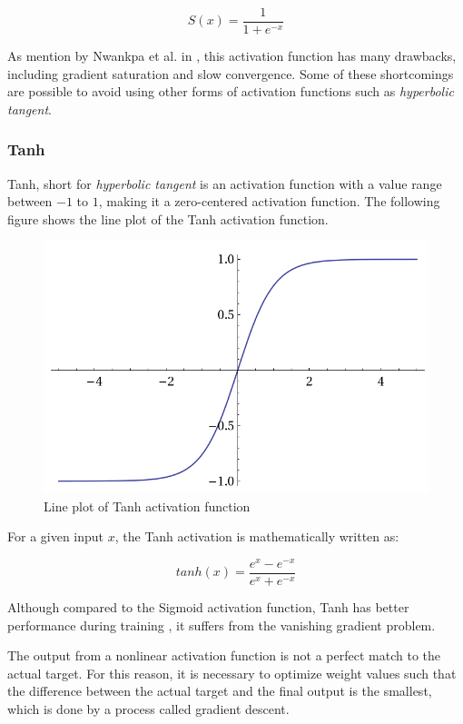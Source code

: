 \begin{equation}
    \label{eqn:sigmoid}
    S(x) = \frac{1}{1 + e^{-x}}
\end{equation}

As mention by Nwankpa et al. in \cite{activation}, this activation function has many drawbacks, including gradient saturation and slow convergence. Some of these shortcomings are possible to avoid using other forms of activation functions such as \textit{hyperbolic tangent}.

\subsubsection{Tanh}\label{subsubsection:tanh}

Tanh, short for \textit{hyperbolic tangent} is an activation function with a value range between $-1$ to $1$, making it a zero-centered activation function. The following figure shows the line plot of the Tanh activation function.

\begin{figure}[h]
    \centering
    \includegraphics[width=0.6\linewidth]{images/background/tanh.png}
    \caption[Tanh activation function]{Line plot of Tanh activation function \cite{tanh}}
    \label{fig:tanh}
\end{figure}

For a given input $x$, the Tanh activation is mathematically written as:

\begin{equation}
    \label{eqn:tanh}
    tanh(x) = \frac{e^{x} - e^{-x}}{e^{x} + e^{-x}}
\end{equation}

Although compared to the Sigmoid activation function, Tanh has better performance during training \cite{tanh_1, tanh_2}, it suffers from the vanishing gradient problem.

The output from a nonlinear activation function is not a perfect match to the actual target. For this reason, it is necessary to optimize weight values such that the difference between the actual target and the final output is the smallest, which is done by a process called gradient descent.

